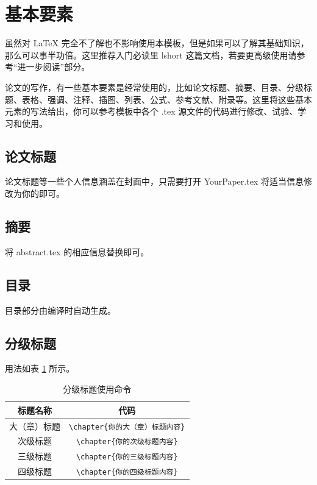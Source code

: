 \section{基本要素}
虽然对 LaTeX 完全不了解也不影响使用本模板，但是如果可以了解其基础知识，那么可以事半功倍。这里推荐入门必读里 lshort 这篇文档，若要更高级使用请参考“进一步阅读”部分。

论文的写作，有一些基本要素是经常使用的，比如论文标题、摘要、目录、分级标题、表格、强调、注释、插图、列表、公式、参考文献、附录等。这里将这些基本元素的写法给出，你可以参考模板中各个 .tex 源文件的代码进行修改、试验、学习和使用。

\subsection{论文标题}
论文标题等一些个人信息涵盖在封面中，只需要打开 YourPaper.tex 将适当信息修改为你的即可。

\subsection{摘要}
将 abstract.tex 的相应信息替换即可。

\subsection{目录}
目录部分由编译时自动生成。

\subsection{分级标题}
用法如表 \ref{tab:fjbt} 所示。
{
\begin{longtable}{cc}
	\caption{分级标题使用命令}\label{tab:fjbt}\\
	\toprule
	标题名称&	代码\\
	\midrule
	大（章）标题&	\verb|\chapter{你的大（章）标题内容}|\\
	次级标题&	\verb|\chapter{你的次级标题内容}|\\
	三级标题&	\verb|\chapter{你的三级标题内容}|\\
	四级标题&	\verb|\chapter{你的四级标题内容}|\\
	\bottomrule
\end{longtable}
}

